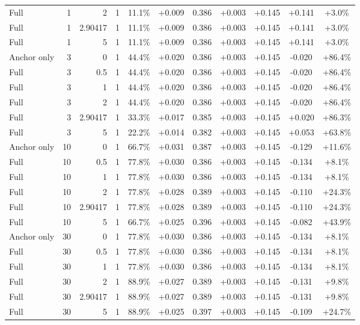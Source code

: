 \begin{table}[htbp]
\begin{tabular}{lrrrccccccc}
Full & 1 & 2 & 1 & 11.1\% & +0.009 & 0.386 & +0.003 & +0.145 & +0.141 & +3.0\% \\
Full & 1 & 2.90417 & 1 & 11.1\% & +0.009 & 0.386 & +0.003 & +0.145 & +0.141 & +3.0\% \\
Full & 1 & 5 & 1 & 11.1\% & +0.009 & 0.386 & +0.003 & +0.145 & +0.141 & +3.0\% \\
Anchor only & 3 & 0 & 1 & 44.4\% & +0.020 & 0.386 & +0.003 & +0.145 & -0.020 & +86.4\% \\
Full & 3 & 0.5 & 1 & 44.4\% & +0.020 & 0.386 & +0.003 & +0.145 & -0.020 & +86.4\% \\
Full & 3 & 1 & 1 & 44.4\% & +0.020 & 0.386 & +0.003 & +0.145 & -0.020 & +86.4\% \\
Full & 3 & 2 & 1 & 44.4\% & +0.020 & 0.386 & +0.003 & +0.145 & -0.020 & +86.4\% \\
Full & 3 & 2.90417 & 1 & 33.3\% & +0.017 & 0.385 & +0.003 & +0.145 & +0.020 & +86.3\% \\
Full & 3 & 5 & 1 & 22.2\% & +0.014 & 0.382 & +0.003 & +0.145 & +0.053 & +63.8\% \\
Anchor only & 10 & 0 & 1 & 66.7\% & +0.031 & 0.387 & +0.003 & +0.145 & -0.129 & +11.6\% \\
Full & 10 & 0.5 & 1 & 77.8\% & +0.030 & 0.386 & +0.003 & +0.145 & -0.134 & +8.1\% \\
Full & 10 & 1 & 1 & 77.8\% & +0.030 & 0.386 & +0.003 & +0.145 & -0.134 & +8.1\% \\
Full & 10 & 2 & 1 & 77.8\% & +0.028 & 0.389 & +0.003 & +0.145 & -0.110 & +24.3\% \\
Full & 10 & 2.90417 & 1 & 77.8\% & +0.028 & 0.389 & +0.003 & +0.145 & -0.110 & +24.3\% \\
Full & 10 & 5 & 1 & 66.7\% & +0.025 & 0.396 & +0.003 & +0.145 & -0.082 & +43.9\% \\
Anchor only & 30 & 0 & 1 & 77.8\% & +0.030 & 0.386 & +0.003 & +0.145 & -0.134 & +8.1\% \\
Full & 30 & 0.5 & 1 & 77.8\% & +0.030 & 0.386 & +0.003 & +0.145 & -0.134 & +8.1\% \\
Full & 30 & 1 & 1 & 77.8\% & +0.030 & 0.386 & +0.003 & +0.145 & -0.134 & +8.1\% \\
Full & 30 & 2 & 1 & 88.9\% & +0.027 & 0.389 & +0.003 & +0.145 & -0.131 & +9.8\% \\
Full & 30 & 2.90417 & 1 & 88.9\% & +0.027 & 0.389 & +0.003 & +0.145 & -0.131 & +9.8\% \\
Full & 30 & 5 & 1 & 88.9\% & +0.025 & 0.397 & +0.003 & +0.145 & -0.109 & +24.7\% \\

\end{tabular}
\end{table}

